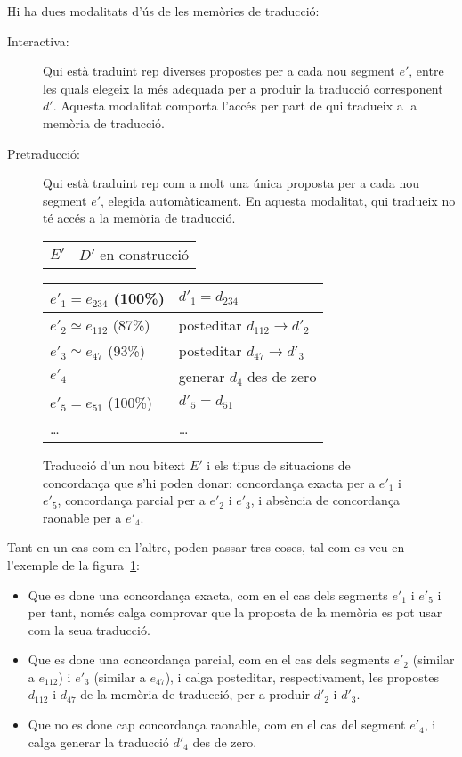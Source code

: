 Hi ha dues modalitats d'ús de les memòries de traducció:
\begin{description}
\item[Interactiva:] Qui està traduint rep diverses propostes per a
  cada nou segment $e'$, entre les quals elegeix la més adequada per a
  produir la traducció corresponent $d'$. Aquesta modalitat comporta
  l'accés per part de qui tradueix a la memòria de traducció.
\item[Pretraducció:] Qui està traduint rep com a molt una única
  proposta per a cada nou segment $e'$, elegida automàticament. En
  aquesta modalitat, qui tradueix no té accés a la memòria de
  traducció.
\end{description}
\begin{figure}
  \begin{center}
    \begin{tabular}{p{3cm}p{4cm}}
           $E'$ & $D'$ en construcció      
    \end{tabular}
    \begin{tabular}{|p{3cm}|p{4cm}|}
\hline
        $e'_1=e_{234}$ (100\%)& $d'_1=d_{234}$ \\\hline
        $e'_2\simeq e_{112}$ (87\%) & posteditar $d_{112} \to d'_2$ \\\hline
        $e'_3\simeq e_{47}$ (93\%) & posteditar $d_{47} \to d'_3$ \\\hline
        $e'_4$ & generar $d_4$ des de zero \\\hline
        $e'_5=e_{51}$ (100\%) & $d'_5=d_{51}$ \\\hline
        \ldots & \ldots \\\hline
    \end{tabular}
  \end{center}
  \caption{Traducció d'un nou bitext $E'$ i els tipus de situacions de concordança que s'hi poden donar: concordança exacta per a $e'_1$ i $e'_5$, concordança parcial per a $e'_2$ i $e'_3$, i absència de concordança raonable per a $e'_4$.}
  \label{fg:pretrad}
\end{figure}
Tant en un cas com en l'altre, poden passar tres coses, tal com es veu
en l'exemple de la figura~\ref{fg:pretrad}:
\begin{itemize}
\item Que es done una concordança exacta, com en el cas dels segments
  $e'_1$ i $e'_5$ i per tant, només calga comprovar que la proposta de
  la memòria es pot usar com la seua traducció.
\item Que es done una concordança parcial, com en el cas dels segments
  $e'_2$ (similar a $e_{112}$) i $e'_3$ (similar a $e_{47}$), i calga
  posteditar, respectivament, les propostes $d_{112}$ i $d_{47}$ de la
  memòria de traducció, per a produir $d'_2$ i $d'_3$.
\item Que no es done cap concordança raonable, com en el cas del
  segment $e'_4$, i calga generar la traducció $d'_4$ des de zero.
\end{itemize}

